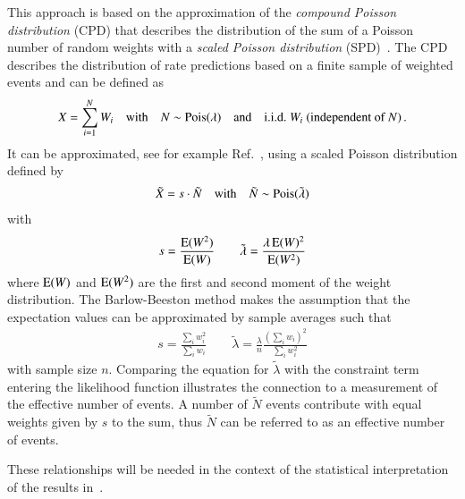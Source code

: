 This approach is based on the approximation of the \emph{compound
  Poisson distribution} (CPD) that describes the distribution of the
sum of a Poisson number of random weights with a \emph{scaled Poisson
  distribution} (SPD)~\cite{Bohm:2013gla}. The CPD describes the
distribution of rate predictions based on a finite sample of weighted
events and can be defined as
\begin{align*}
  X = \sum_{i = 1}^{N} W_i \quad \text{with} \quad N \sim \operatorname{Pois}(\lambda) \quad \text{and} \quad \text{i.i.d.\ } W_i \text{ (independent of }N\text{)} \,\text{.}
\end{align*}
It can be approximated, see for example Ref.~\cite{Bohm:2013gla},
using a scaled Poisson distribution defined by
\begin{align*}
  \tilde{X} = s \cdot \tilde{N} \quad \text{with} \quad \tilde{N} \sim \operatorname{Pois}(\tilde{\lambda})
\end{align*}
with
\begin{align*}
  s = \frac{\operatorname{E}(W^2)}{\operatorname{E}(W)} \qquad \tilde{\lambda} = \frac{\lambda \operatorname{E}(W)^2}{\operatorname{E}(W^2)}
\end{align*}
where $\operatorname{E}(W)$ and $\operatorname{E}(W^2)$ are the first and second moment
of the weight distribution. The Barlow-Beeston method makes the
assumption that the expectation values can be approximated by sample
averages such that
\begin{align*}
  s = \frac{\sum_i w_i^2}{\sum_i w_i} \qquad \tilde{\lambda} = \frac{\lambda}{n} \frac{(\sum_i w_i)^2}{\sum_i w_i^2}
\end{align*}
with sample size $n$. Comparing the equation for $\tilde{\lambda}$
with the constraint term entering the likelihood function illustrates
the connection to a measurement of the effective number of events. A
number of $\tilde{N}$ events contribute with equal weights given by
$s$ to the sum, thus $\tilde{N}$ can be referred to as an effective
number of events.

These relationships will be needed in the context of the statistical
interpretation of the results in~.

